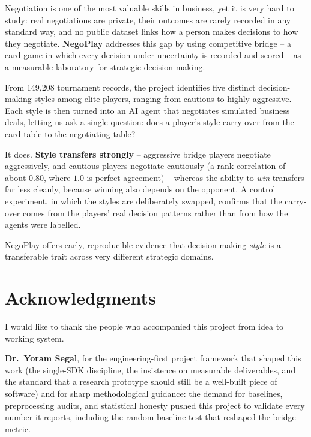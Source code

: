 \documentclass[11pt, a4paper, oneside, openany]{report}
\begin{document}
Negotiation is one of the most valuable skills in business, yet it is
very hard to study: real negotiations are private, their outcomes are
rarely recorded in any standard way, and no public dataset links how a person
makes decisions to how they negotiate. \textbf{NegoPlay} addresses this gap by
using competitive bridge -- a card game in which every decision under
uncertainty is recorded and scored -- as a measurable laboratory for strategic
decision-making.

From 149{,}208 tournament records, the project identifies five distinct
decision-making styles among elite players, ranging from cautious to highly
aggressive. Each style is then turned into an AI agent that negotiates
simulated business deals, letting us ask a single question: does a player's
style carry over from the card table to the negotiating table?

It does. \textbf{Style transfers strongly} -- aggressive bridge players
negotiate aggressively, and cautious players negotiate cautiously (a rank
correlation of about $0.80$, where $1.0$ is perfect agreement) -- whereas the
ability to \emph{win} transfers far less cleanly, because winning also depends
on the opponent. A control experiment, in which the styles are deliberately
swapped, confirms that the carry-over comes from the players' real
decision patterns rather than from how the agents were labelled.

NegoPlay offers early, reproducible evidence that decision-making
\emph{style} is a transferable trait across very different strategic domains.

\clearpage
\chapter*{Acknowledgments}

\vspace{0.5cm}
I would like to thank the people who accompanied this project from idea to
working system.

\vspace{0.4cm}
\textbf{Dr.\ Yoram Segal}, for the engineering-first project framework that
shaped this work (the single-SDK discipline, the insistence on measurable
deliverables, and the standard that a research prototype should still be a
well-built piece of software) and for sharp methodological guidance: the
demand for baselines, preprocessing audits, and statistical honesty pushed
this project to validate every number it reports, including the
random-baseline test that reshaped the bridge metric.
\end{document}
